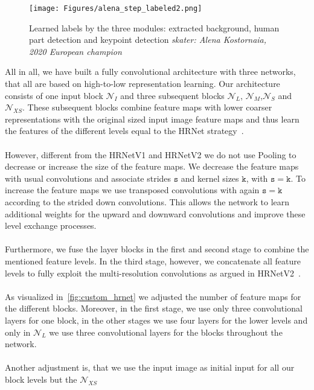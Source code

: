 \begin{figure}
    \centering
    \texttt{[image: Figures/alena\_step\_labeled2.png]}
    \decoRule
    \caption[HRNetV3: Predictions from Alena Kostornaia's Steps]{Learned labels by the three modules: extracted background, human part detection and
    keypoint detection \textit{skater: Alena Kostornaia, 2020 European champion\cite{2020european}}}
    \label{fig:alena_step_labeled}
\end{figure}


All in all, we have built a fully convolutional architecture with three networks, that all are based on high-to-low
representation learning. Our architecture consists of one input block $\mathcal{N}_I$  and three subsequent blocks
$\mathcal{N}_L$, $\mathcal{N}_M$,$\mathcal{N}_S$ and $\mathcal{N}_{XS}$.
These subsequent blocks combine feature maps with lower coarser representations with the original sized input image
feature maps and thus learn the features of the different levels equal to the HRNet strategy~\cite{HRNetv2, HRNetv1}.
\\\mbox{}\\
However, different from the HRNetV1 and HRNetV2 we do not use Pooling to decrease or increase the size of the feature
maps. We decrease the feature maps with usual convolutions and associate strides $\mathtt{s}$ and kernel sizes
$\mathtt{k}$, with $\mathtt{s}=\mathtt{k}$.
To increase the feature maps we use transposed convolutions with again $\mathtt{s}=\mathtt{k}$ according to the
strided down convolutions.
This allows the network to learn additional weights for the upward and downward convolutions and improve these level
exchange processes.
\\\mbox{}\\
Furthermore, we fuse the layer blocks in the first and second stage to combine the mentioned feature levels.
In the third stage, however, we concatenate all feature levels to fully exploit the multi-resolution convolutions
as argued in HRNetV2~\cite{HRNetv2}.
\\\mbox{}\\
As visualized in~\ref{fig:custom_hrnet} we adjusted the number of feature maps for the different blocks.
Moreover, in the first stage, we use only three convolutional layers for one block, in the other stages we use four layers
for the lower levels and only in $\mathcal{N}_L$ we use three convolutional layers for the blocks throughout the network.
\\\mbox{}\\
Another adjustment is, that we use the input image as initial input for all our block levels but the $\mathcal{N}_{XS}$
